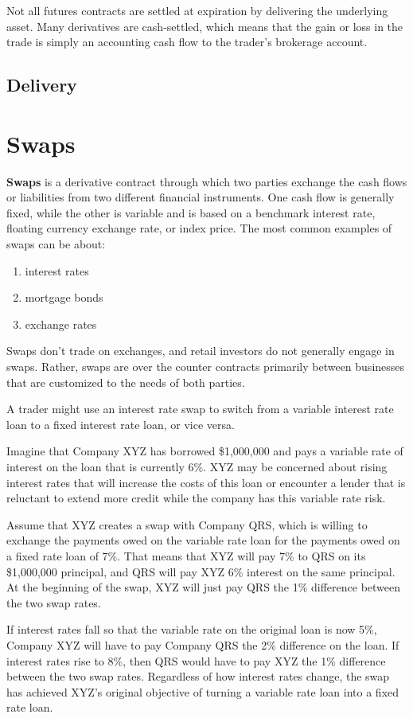 \documentclass{article}
\begin{document}
    Not all futures contracts are settled at expiration by delivering the underlying asset. Many derivatives are cash-settled, which means that the gain or loss in the trade is simply an accounting cash flow to the trader's brokerage account. 

  \subsection{Delivery}
  

\section{Swaps}

  \begin{definition}[Swap]
    \textbf{Swaps} is a derivative contract through which two parties exchange the cash flows or liabilities from two different financial instruments. One cash flow is generally fixed, while the other is variable and is based on a benchmark interest rate, floating currency exchange rate, or index price. The most common examples of swaps can be about: 
    \begin{enumerate}
      \item interest rates
      \item mortgage bonds 
      \item exchange rates
    \end{enumerate}
    Swaps don't trade on exchanges, and retail investors do not generally engage in swaps. Rather, swaps are over the counter contracts primarily between businesses that are customized to the needs of both parties. 
  \end{definition}

  \begin{example}
    A trader might use an interest rate swap to switch from a variable interest rate loan to a fixed interest rate loan, or vice versa. 

    Imagine that Company XYZ has borrowed \$1,000,000 and pays a variable rate of interest on the loan that is currently 6\%. XYZ may be concerned about rising interest rates that will increase the costs of this loan or encounter a lender that is reluctant to extend more credit while the company has this variable rate risk. 

    Assume that XYZ creates a swap with Company QRS, which is willing to exchange the payments owed on the variable rate loan for the payments owed on a fixed rate loan of 7\%. That means that XYZ will pay 7\% to QRS on its \$1,000,000 principal, and QRS will pay XYZ 6\% interest on the same principal. At the beginning of the swap, XYZ will just pay QRS the 1\% difference between the two swap rates.

    If interest rates fall so that the variable rate on the original loan is now 5\%, Company XYZ will have to pay Company QRS the 2\% difference on the loan. If interest rates rise to 8\%, then QRS would have to pay XYZ the 1\% difference between the two swap rates. Regardless of how interest rates change, the swap has achieved XYZ's original objective of turning a variable rate loan into a fixed rate loan.
  \end{example}
\end{document}
